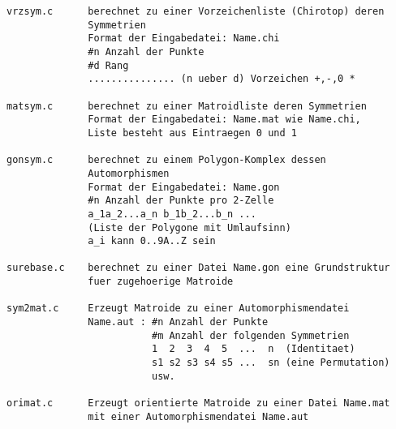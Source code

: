 \begin{verbatim}
vrzsym.c      berechnet zu einer Vorzeichenliste (Chirotop) deren
              Symmetrien
              Format der Eingabedatei: Name.chi
              #n Anzahl der Punkte
              #d Rang
              ............... (n ueber d) Vorzeichen +,-,0 *

matsym.c      berechnet zu einer Matroidliste deren Symmetrien
              Format der Eingabedatei: Name.mat wie Name.chi,
              Liste besteht aus Eintraegen 0 und 1

gonsym.c      berechnet zu einem Polygon-Komplex dessen
              Automorphismen
              Format der Eingabedatei: Name.gon
              #n Anzahl der Punkte pro 2-Zelle
              a_1a_2...a_n b_1b_2...b_n ...
              (Liste der Polygone mit Umlaufsinn)
              a_i kann 0..9A..Z sein

surebase.c    berechnet zu einer Datei Name.gon eine Grundstruktur
              fuer zugehoerige Matroide

sym2mat.c     Erzeugt Matroide zu einer Automorphismendatei
              Name.aut : #n Anzahl der Punkte
                         #m Anzahl der folgenden Symmetrien
                         1  2  3  4  5  ...  n  (Identitaet)
                         s1 s2 s3 s4 s5 ...  sn (eine Permutation)
                         usw.

orimat.c      Erzeugt orientierte Matroide zu einer Datei Name.mat
              mit einer Automorphismendatei Name.aut
\end{verbatim}
